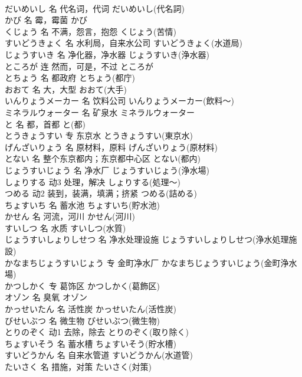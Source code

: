 \documentclass[8pt]{extreport}
\begin{document}
\begin{CJK}{UTF8}{min}
\\	だいめいし	名	代名词，代词	だいめいし(代名詞)	
\\	かび	名	霉，霉菌	かび	
\\	くじょう	名	不满，怨言，抱怨	くじょう(苦情)	
\\	すいどうきょく	名	水利局，自来水公司	すいどうきょく(水道局)	
\\	じょうすいき	名	净化器，净水器	じょうすいき(浄水器)	
\\	ところが	连	然而，可是，不过	ところが	
\\	とちょう	名	都政府	とちょう(都庁)	
\\	おおて	名	大，大型	おおて(大手)	
\\	いんりょうメーカー	名	饮料公司	いんりょうメーカー(飲料～)	
\\	ミネラルウォーター	名	矿泉水	ミネラルウォーター	
\\	と	名	都，首都	と(都)	
\\	とうきょうすい	专	东京水	とうきょうすい(東京水)	
\\	げんざいりょう	名	原材料，原料	げんざいりょう(原材料)	
\\	とない	名	整个东京都内；东京都中心区	とない(都内)	
\\	じょうすいじょう	名	净水厂	じょうすいじょう(浄水場)	
\\	しょりする	动3	处理，解决	しょりする(処理～)	
\\	つめる	动2	装到，装满，填满；挤紧	つめる(詰める)	
\\	ちょすいち	名	蓄水池	ちょすいち(貯水池)	
\\	かせん	名	河流，河川	かせん(河川)	
\\	すいしつ	名	水质	すいしつ(水質)	
\\	じょうすいしょりしせつ	名	净水处理设施	じょうすいしょりしせつ(浄水処理施設)	
\\	かなまちじょうすいじょう	专	金町净水厂	かなまちじょうすいじょう(金町浄水場)	
\\	かつしかく	专	葛饰区	かつしかく(葛飾区)	
\\	オゾン	名	臭氧	オゾン	
\\	かっせいたん	名	活性炭	かっせいたん(活性炭)	
\\	びせいぶつ	名	微生物	びせいぶつ(微生物)	
\\	とりのぞく	动1	去除，除去	とりのぞく(取り除く)	
\\	ちょすいそう	名	蓄水槽	ちょすいそう(貯水槽)	
\\	すいどうかん	名	自来水管道	すいどうかん(水道管)	
\\	たいさく	名	措施，对策	たいさく(対策)	

\end{CJK}
\end{document}
